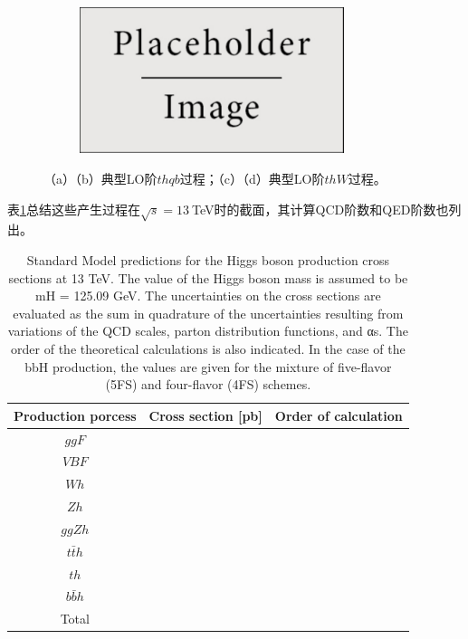 \begin{figure}[h]
\begin{subfigure}[b]{0.33\textwidth}
  \caption{}
  \label{fig:diagram_ggzh1}
 \end{subfigure}
 \begin{subfigure}[b]{0.33\textwidth}
  \includegraphics[width=0.85\textwidth]{fig/placeholder.pdf}
  \caption{}
  \label{fig:diagram_ggzh1}
 \end{subfigure}
\caption{（a）（b）典型LO阶$thqb$过程；（c）（d）典型LO阶$thW$过程。}
\label{fig:diagram_th}
\end{figure}

表\ref{tab:xs_single_higgss_prod}总结这些产生过程在$\sqrt{s}=13~$TeV时的截面，其计算QCD阶数和QED阶数也列出。
\begin{table}[h]
\centering
\begin{tabular}{ccc}
\hline
\hline
Production porcess   &Cross section [pb]    &Order of calculation \\
\hline
$ggF$   &   &  \\
$VBF$   &   &   \\
$Wh$   &   &   \\
$Zh$   &    &  \\
$ggZh$    &    &  \\
$t\bar{t}h$  &    &  \\
$th$  &    &  \\
$b\bar{b}h$  &   &  \\
\hline
Total    &    &  \\ 
\hline
\hline
\end{tabular}
\caption{Standard Model predictions for the Higgs boson production cross sections at 13 TeV. The value of the Higgs boson mass is assumed to be mH = 125.09 GeV. The uncertainties on the cross sections are evaluated as the sum in quadrature of the uncertainties resulting from variations of the QCD scales, parton distribution functions, and αs. The order of the theoretical calculations is also indicated. In the case of the bbH production, the values are given for the mixture of five-flavor (5FS) and four-flavor (4FS) schemes.}
\label{tab:xs_single_higgss_prod}
\end{table}

